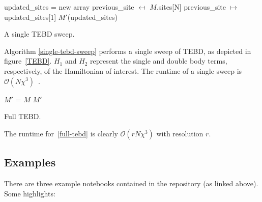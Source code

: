 \documentclass[12pt]{article}
\begin{document}
\begin{multicols}{2}
	\begin{algorithm}[H]
		updated\_sites = new array\;
		previous\_site $\mapsfrom$ $M$.sites[N]\;
		previous\_site $\mapsto$ updated\_sites[1]\;
		\Return $M'$(updated\_sites)\;
		\caption{A single TEBD sweep.}
		\label{single-tebd-sweep}
	\end{algorithm}
	Algorithm \ref{single-tebd-sweep} performs a single sweep of TEBD, as depicted in figure~\ref{TEBD}. $H_1$ and $H_2$ represent the single and double body terms, respectively, of the Hamiltonian of interest. The runtime of a single sweep is $\mathcal{O}(N\chi^3)$~\cite{Vidal}.
	\begin{algorithm}[H]
		$M'$ = $M$
		\Return $M'$\;
		\caption{Full TEBD.}
		\label{full-tebd}
	\end{algorithm}
	The runtime for~\ref{full-tebd} is clearly $\mathcal{O}(rN\chi^3)$ with resolution $r$.
	\subsection{Examples}
	There are three example notebooks contained in the repository (as
	linked above). Some highlights:


\end{multicols}
\end{document}
